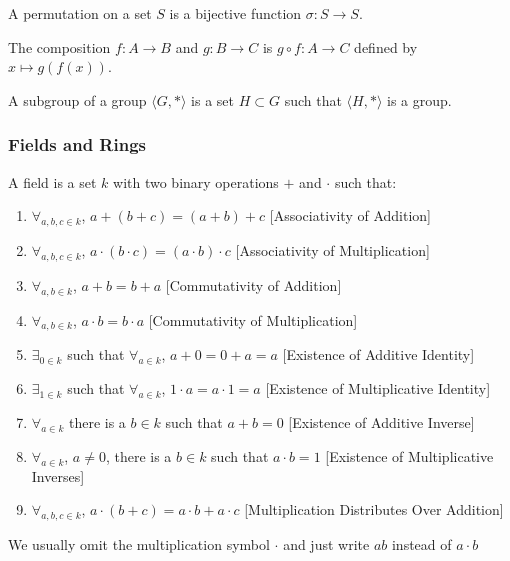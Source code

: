 \documentclass[crop=false,class=book,oneside]{standalone}
\begin{document}
\begin{definition}
A permutation on a set $S$ is a bijective function $\sigma:S\rightarrow S$.
\end{definition}
\begin{definition}
The composition $f:A\rightarrow B$ and $g:B\rightarrow C$ is $g\circ f:A\rightarrow C$ defined by $x\mapsto g(f(x))$.
\end{definition}
\begin{definition}
A subgroup of a group $\langle G,*\rangle$ is a set $H\subset G$ such that $\langle H,*\rangle$ is a group.
\end{definition}
\subsubsection{Fields and Rings}
\begin{definition}
A field is a set $k$ with two binary operations $+$ and $\cdot$ such that:
\begin{enumerate}
    \item $\forall_{a,b,c\in k}$, $a+(b+c)=(a+b)+c$ \hfill [Associativity of Addition]
    \item $\forall_{a,b,c\in k}$, $a\cdot(b\cdot c) = (a\cdot b)\cdot c$ \hfill [Associativity of Multiplication]
    \item $\forall_{a,b\in k}$, $a+b=b+a$ \hfill [Commutativity of Addition]
    \item $\forall_{a,b\in k}$, $a\cdot b = b\cdot a$ \hfill [Commutativity of Multiplication]
    \item $\exists_{0 \in k}$ such that $\forall_{a\in k}$, $a+0=0+a = a$ \hfill [Existence of Additive Identity]
    \item $\exists_{1\in k}$ such that $\forall_{a\in k}$, $1\cdot a=a\cdot 1 = a$ \hfill [Existence of Multiplicative Identity]
    \item $\forall_{a\in k}$ there is a $b\in k$ such that $a+b=0$ \hfill [Existence of Additive Inverse]
    \item $\forall_{a\in k}$, $a\ne 0$, there is a $b\in k$ such that $a\cdot b = 1$ \hfill [Existence of Multiplicative Inverses]
    \item $\forall_{a,b,c\in k}$, $a\cdot(b+c) = a\cdot b + a\cdot c$ \hfill [Multiplication Distributes Over Addition]
\end{enumerate}
\end{definition}
\begin{remark}
We usually omit the multiplication symbol $\cdot$ and just write $ab$ instead of $a\cdot b$
\end{remark}
\end{document}
